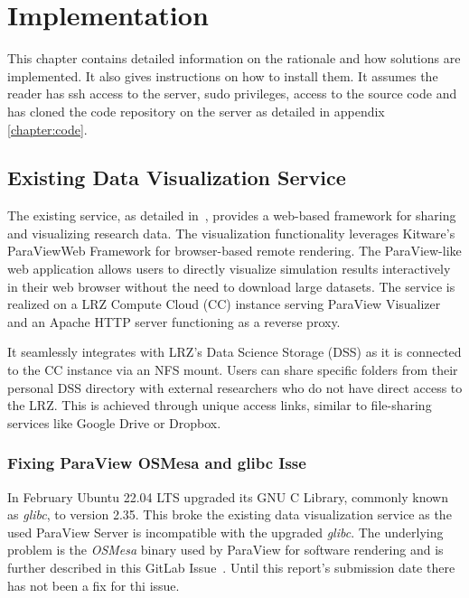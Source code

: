 \chapter{Implementation}\label{chapter:implementation}

This chapter contains detailed information on the rationale and how solutions
are implemented. It also gives instructions on how to install them. It assumes
the reader has ssh access to the server, sudo privileges, access to the source
code and has cloned the code repository on the server as detailed in appendix
\ref{chapter:code}.

\section{Existing Data Visualization Service}

The existing service, as detailed in~\cite{nowak2024pvw}, provides a web-based
framework for sharing and visualizing research data. The visualization
functionality leverages Kitware's ParaViewWeb Framework for browser-based remote
rendering. The ParaView-like web application allows users to directly visualize
simulation results interactively in their web browser without the need to
download large datasets. The service is realized on a LRZ Compute Cloud (CC)
instance serving ParaView Visualizer and an Apache HTTP server functioning as a
reverse proxy.

It seamlessly integrates with LRZ's Data Science Storage (DSS) as it is
connected to the CC instance via an NFS mount. Users can share specific folders
from their personal DSS directory with external researchers who do not have
direct access to the LRZ. This is achieved through unique access links, similar
to file-sharing services like Google Drive or Dropbox.

\subsection{Fixing ParaView OSMesa and glibc Isse}

In February Ubuntu 22.04 LTS upgraded its GNU C Library, commonly known as
\textit{glibc}, to version 2.35. This broke the existing data visualization
service as the used ParaView Server is incompatible with the upgraded
\textit{glibc}. The underlying problem is the \textit{OSMesa} binary used by
ParaView for software rendering and is further described in this GitLab
Issue~\cite{kitwareOsmesaBinary}. Until this report's submission date there has
not been a fix for thi issue.

